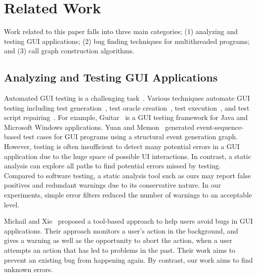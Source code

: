 
\tinystep
\section{Related Work}

Work related to this paper falls into three main categories; (1)
analyzing and testing GUI applications; (2)
bug finding techniques for multithreaded programs; and (3)
call graph construction algorithms.

\tinystep
\subsection{Analyzing and Testing GUI Applications}

Automated GUI testing is a challenging task~\cite{Bertolino:2007:STR:1253532.1254712,
Harrold:2000:TR:336512.336532}.
Various techniques automate GUI testing including
test generation~\cite{YuanMemonICSE2007},
test oracle creation~\cite{MemonFSE2000}, test execution~\cite{YuanCohenMemonTSE2011},
and test script repairing~\cite{Huang:2010:RGT:1828417.1828465, Daniel:2011:AGR:2002931.2002937}.
For example,
Guitar~\cite{YuanCohenMemonTSE2011, YuanMemonICSE2007}
is a GUI testing framework for Java and Microsoft Windows applications. 
Yuan and Memon~\cite{YuanMemonICSE2007} generated event-sequence-based test cases for GUI
programs using a structural event generation graph. 
However, testing is often insufficient to detect many potential
errors in a GUI application due to the huge space of possible UI interactions.
In contrast, a static analysis can explore all paths to find potential errors missed by testing.
Compared to software testing, a static analysis tool such as ours may
report false positives and redundant warnings due to its conservative nature.
In our experiments, simple error filters reduced the number of warnings to
an acceptable level.


Michail and Xie~\cite{michail05:helping} proposed a tool-based approach to help users avoid bugs
in GUI applications. Their approach monitors a user's action in the background,
and gives a warning as well as the opportunity to abort the action, when
a user attempts an action that has led to problems in the past. 
Their work aims to prevent an existing bug from happening again.
By contrast, our work aims to find unknown errors.


